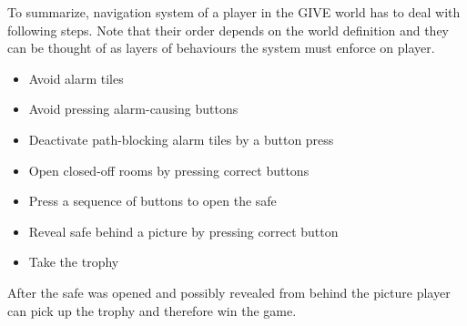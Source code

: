 To summarize, navigation system of a player in the GIVE world has to deal with following steps. Note that their order depends on the world definition and they can be thought of as layers of behaviours the system must enforce on player.

\begin{itemize}
\item
Avoid alarm tiles
\item
Avoid pressing alarm-causing buttons
\item
Deactivate path-blocking alarm tiles by a button press
\item
Open closed-off rooms by pressing correct buttons
\item
Press a sequence of buttons to open the safe
\item
Reveal safe behind a picture by pressing correct button
\item
Take the trophy
\end{itemize}

After the safe was opened and possibly revealed from behind the picture player can pick up the trophy and therefore win the game.